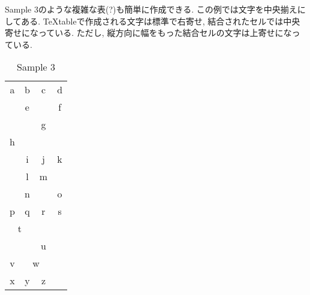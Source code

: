 \documentclass{jsarticle}
\begin{document}
Sample 3のような複雑な表(?)も簡単に作成できる.
この例では文字を中央揃えにしてある.
TeXtableで作成される文字は標準で右寄せ, 結合されたセルでは中央寄せになっている.
ただし, 縦方向に幅をもった結合セルの文字は上寄せになっている.

\begin{table}[htb]
	\caption{Sample 3}
	\label{sample3}
	\centering
	\begin{tabular}{|c|c|c|c|}\hline
		\multicolumn{1}{|c|}{a}	&b	&\multicolumn{1}{|c|}{c}	&d	\\ \cline{2-2}\cline{4-4}
		\multicolumn{1}{|c|}{}	&e	&\multicolumn{1}{|c|}{}	&f	\\ \cline{2-4}
		\multicolumn{1}{|c|}{}	&\multicolumn{3}{|c|}{g}	\\ \cline{1-1}
		\multicolumn{1}{|c|}{h}	&\multicolumn{3}{|c|}{}	\\ \cline{2-4}
		\multicolumn{1}{|c|}{}	&i	&j	&\multicolumn{1}{|c|}{k}	\\ \cline{2-3}
		\multicolumn{1}{|c|}{}	&l	&\multicolumn{1}{|c|}{m}	&\multicolumn{1}{|c|}{}	\\ \cline{2-2}\cline{4-4}
		\multicolumn{1}{|c|}{}	&n	&\multicolumn{1}{|c|}{}	&o	\\ \hline
		p	&q	&\multicolumn{1}{|c|}{r}	&\multicolumn{1}{|c|}{s}	\\ \cline{1-2}
		\multicolumn{2}{|c|}{t}	&\multicolumn{1}{|c|}{}	&\multicolumn{1}{|c|}{}	\\ \cline{3-3}
		\multicolumn{2}{|c|}{}	&u	&\multicolumn{1}{|c|}{}	\\ \cline{1-3}
		v	&\multicolumn{2}{|c|}{w}	&\multicolumn{1}{|c|}{}	\\ \cline{1-3}
		x	&y	&z	&\multicolumn{1}{|c|}{}	\\ \hline
	\end{tabular}
\end{table}

\end{document}
